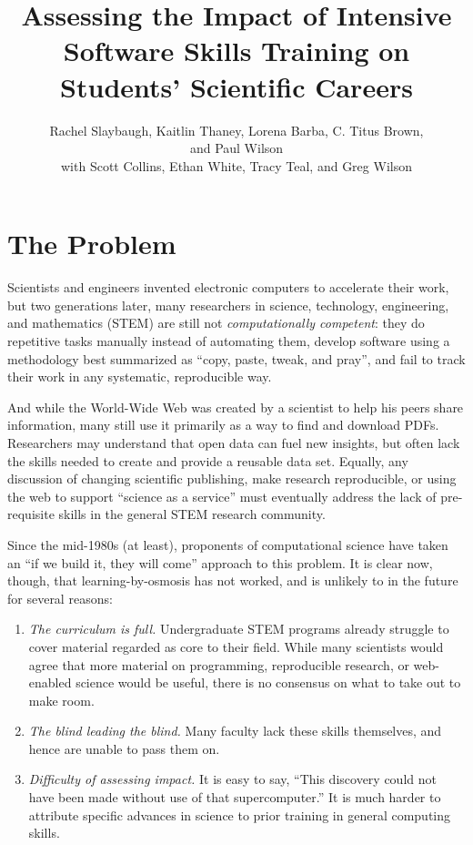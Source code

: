 \documentclass[11pt]{article}
\title{
  Assessing the Impact of Intensive Software Skills Training
  on Students' Scientific Careers
}
\author{
  Rachel Slaybaugh, Kaitlin Thaney, Lorena Barba, C. Titus Brown,\\   
  and Paul Wilson\\ 
  with Scott Collins, Ethan White, Tracy Teal, and Greg Wilson
}
\begin{document}
\maketitle
\pagebreak
%
%

\section{The Problem}

Scientists and engineers invented electronic computers to accelerate
their work, but two generations later, many researchers in science,
technology, engineering, and mathematics (STEM) are still not
\emph{computationally competent}: they do repetitive tasks manually
instead of automating them, develop software using a methodology best
summarized as ``copy, paste, tweak, and pray'', and fail to track
their work in any systematic, reproducible way.

And while the World-Wide Web was created by a scientist to help his
peers share information, many still use it primarily as a way to find
and download PDFs.  Researchers may understand that open data can fuel
new insights, but often lack the skills needed to create and provide a
reusable data set.  Equally, any discussion of changing scientific
publishing, make research reproducible, or using the web to support
``science as a service'' must eventually address the lack of
pre-requisite skills in the general STEM research community.

Since the mid-1980s (at least), proponents of computational science
have taken an ``if we build it, they will come'' approach to this
problem.  It is clear now, though, that learning-by-osmosis has not
worked, and is unlikely to in the future for several reasons:

\begin{enumerate}

\item
  \emph{The curriculum is full.}  Undergraduate STEM programs already
  struggle to cover material regarded as core to their field.  While
  many scientists would agree that more material on programming,
  reproducible research, or web-enabled science would be useful, there
  is no consensus on what to take out to make room.

\item
  \emph{The blind leading the blind.}  Many faculty lack these skills
  themselves, and hence are unable to pass them on.

\item
  \emph{Difficulty of assessing impact.} It is easy to say, ``This
  discovery could not have been made without use of that
  supercomputer.''  It is much harder to attribute specific advances
  in science to prior training in general computing skills.

\end{enumerate}
\end{document}
